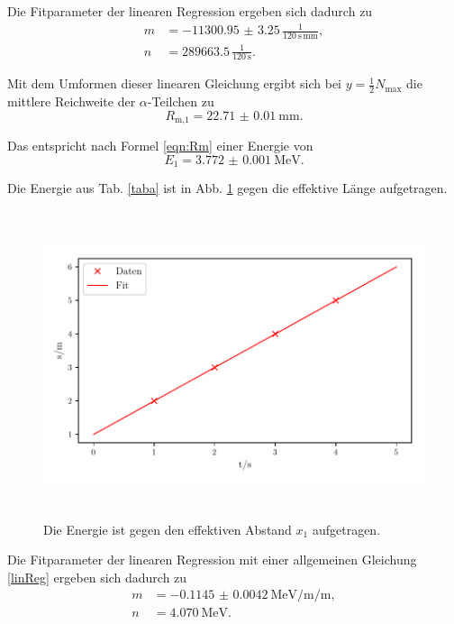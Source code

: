 \noindent Die Fitparameter der linearen Regression ergeben sich dadurch zu 
\begin{align*}
    m &= - \num{11300.95(325)} \,\frac{\text{1}}{\SI{120}{\second}\, \si{\milli\meter}}, \\
    n &= \num{289663.5} \, \frac{\text{1}}{\SI{120}{\second}} .
\end{align*}


\noindent Mit dem Umformen dieser linearen Gleichung ergibt sich bei $y = \frac{1}{2} N_\text{max}$ die mittlere Reichweite der $\alpha$-Teilchen zu %
\begin{equation*}
    R_\text{m,1} = \SI{22.71(1)}{\milli\meter}.
\end{equation*}

\noindent Das entspricht nach Formel \eqref{eqn:Rm} einer Energie von %
\begin{equation*}
    E_1 = \SI{3.772(1)}{\mega\electronvolt}.
\end{equation*}

\noindent Die Energie aus Tab. \ref{taba} ist in Abb. \ref{fig:energie1} gegen die effektive Länge aufgetragen.
\begin{figure}
    \centering
    \includegraphics[width=15cm, height=9cm]{build/plotb.pdf}
    \caption{Die Energie ist gegen den effektiven Abstand $x_1$ aufgetragen.}
    \label{fig:energie1}
\end{figure}

\noindent Die Fitparameter der linearen Regression mit einer allgemeinen Gleichung \eqref{linReg} ergeben sich dadurch zu 
\begin{align*}
    m &= - \SI{0.1145(42)}{\mega\electronvolt\per\milli\per\meter}, \\
    n &= \SI{4.070}{\mega\electronvolt} .
\end{align*}

